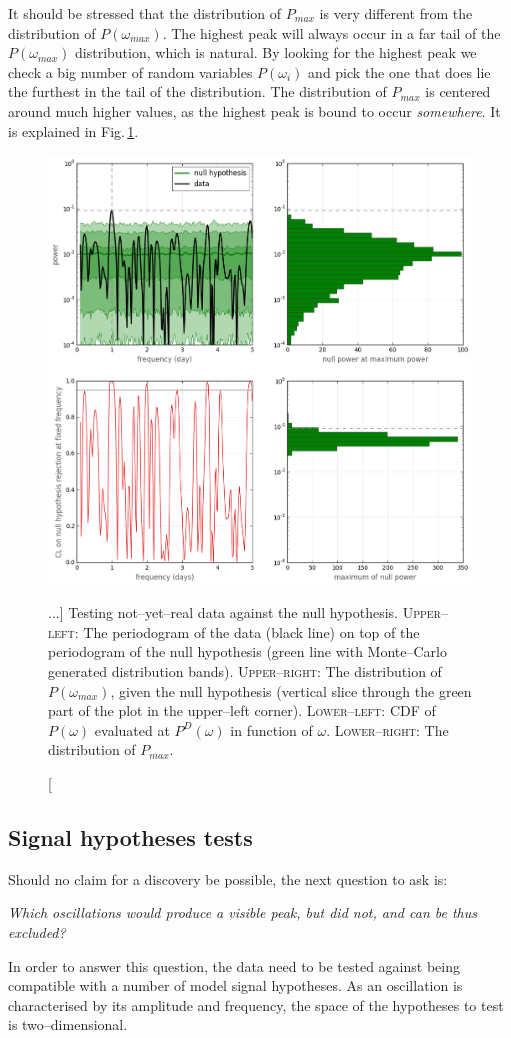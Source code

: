 It should be stressed that the distribution of $P_{max}$ is very different from the distribution of $P(\omega_{max})$. The highest peak will always occur in a far tail of the $P(\omega_{max})$ distribution, which is natural. By looking for the highest peak we check a big number of random variables $P(\omega_i)$ and pick the one that does lie the furthest in the tail of the distribution. The distribution of $P_{max}$ is centered around much higher values, as the highest peak is bound to occur \emph{somewhere}. It is explained in Fig.\,\ref{fig:axions_null_rejection}.

\begin{figure}[bth]
  \myfloatalign
  \includegraphics[width=.8\linewidth]{gfx/axions/axionMC_null_rejection}
  \caption
  [...]
  {
Testing not--yet--real data against the null hypothesis. \textsc{Upper--left:} The periodogram of the data (black line) on top of the periodogram of the null hypothesis (green line with Monte--Carlo generated distribution bands). \textsc{Upper--right:} The distribution of $P(\omega_{max})$, given the null hypothesis (vertical slice through the green part of the plot in the upper--left corner). \textsc{Lower--left:} CDF of $P(\omega)$ evaluated at $P^D(\omega)$ in function of $\omega$. \textsc{Lower--right:} The distribution of $P_{max}$. }
  \label{fig:axions_null_rejection}
\end{figure}


\subsection{Signal hypotheses tests}
Should no claim for a discovery be possible, the next question to ask is:
\begin{center}
  \emph{Which oscillations would produce a visible peak, but did not, and can be thus excluded?}
\end{center}
In order to answer this question, the data need to be tested against being compatible with a number of model signal hypotheses. As an oscillation is characterised by its amplitude and frequency, the space of the hypotheses to test is two--dimensional.

